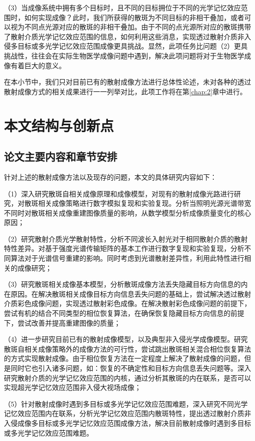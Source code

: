 （3）当成像系统中拥有多个目标时，且不同的目标拥位于不同的光学记忆效应范围时，如何实现成像？此时，我们所获得的散斑为不同目标的非相干叠加，或者可以视为不同点光源对应的散斑的非相干叠加。由于不同的点光源所对应的散斑携带了散射介质光学记忆效应范围的信息，如何利用这些消息，实现透过散射介质非入侵多目标或多光学记忆效应范围成像更具挑战。显然，此项任务比问题（2）更具挑战性，往往会在实际生物医学成像问题中遇到，解决此项问题将对于生物医学成像有着巨大的意义。

在本小节中，我们只对目前已有的散射成像方法进行总体性论述，未对各种的透过散射成像方式的相关成果进行一一列举对比，此项工作将在第\ref{chap:2}章中进行。

\section{本文结构与创新点}

\subsection{论文主要内容和章节安排}
针对上述的散射成像方法以及现存的问题，本文的具体研究内容如下：

（1）深入研究散斑自相关成像原理和成像模型，对现有的散射成像光路进行研究，对散斑相关成像策略进行数字模拟复现和实验复现。分析当照明光源光谱带宽不同时对散斑相关成像重建图像质量的影响，从数学模型分析成像质量变化的核心原因；

（2）研究散射介质光学散射特性，分析不同波长入射光对于相同散射介质的散射特性差异。对基于强度光谱传输矩阵的基本工作进行数字复现和实验复现，分析不同算法对于光谱信号重建的影响。同时考虑到光谱散射差异性，利用此特性进行相关的成像研究；

（3）研究散斑相关成像基本模型，分析散斑成像方法丢失隐藏目标方向信息的内在原因。在解决散斑相关成像目标方向信息丢失问题的基础上，尝试解决透过散射介质彩色成像问题，实现透过散射彩色成像。在解决散射彩色成像问题的前提下，尝试有机的结合不同类型的相位恢复算法，在确保恢复隐藏目标方向信息的前提下，尝试改善并提高重建图像的质量；

（4）进一步研究目前已有的散射成像模型，以及典型非入侵光学成像模型。研究散斑自相关成像策略外的成像方法的可行性，尝试跳出散斑相关混合相位恢复算法的方式实现散射成像。由于相位恢复方法在一定程度上解决了散射成像的问题，但是同时它也引入诸多问题，如：恢复的不确定性和目标方向信息丢失问题等。深入研究散射介质的光学记忆效应范围的内核，通过分析其散斑的内在联系，是否可以实现超光学记忆效应范围非入侵大视场成像；

（5）针对散射成像时遇到多目标或多光学记忆效应范围难题，深入研究不同光学记忆效应范围内在联系，分析光学记忆效应范围内散斑特性，提出透过散射介质非入侵成像多目标或多光学记忆效应范围成像方法，解决目前散射成像时遇到多目标或多光学记忆效应范围难题。

